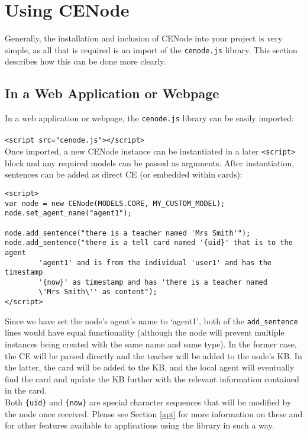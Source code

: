 \documentclass{scrartcl}
\newcommand{\js}[1]{\texttt{#1}}
\begin{document}
\section{Using CENode}
Generally, the installation and inclusion of CENode into your project is very simple, as all that is required is an import of the \js{cenode.js} library. This section describes how this can be done more clearly.

\subsection{In a Web Application or Webpage}
\label{as_a_webapp}
In a web application or webpage, the \js{cenode.js} library can be easily imported:\\
\\\js{<script src="cenode.js"></script>}\\

Once imported, a new CENode instance can be instantiated in a later \js{<script>} block and any required models can be passed as arguments. After instantiation, sentences can be added as direct CE (or embedded within cards):
\begin{verbatim}
<script>
var node = new CENode(MODELS.CORE, MY_CUSTOM_MODEL);
node.set_agent_name("agent1");

node.add_sentence("there is a teacher named 'Mrs Smith'");
node.add_sentence("there is a tell card named '{uid}' that is to the agent 
        'agent1' and is from the individual 'user1' and has the timestamp 
        '{now}' as timestamp and has 'there is a teacher named 
        \'Mrs Smith\'' as content");
</script>
\end{verbatim}

Since we have set the node's agent's name to `agent1', both of the \js{add\_sentence} lines would have equal functionality (although the node will prevent multiple instances being created with the same name and same type). In the former case, the CE will be parsed directly and the teacher will be added to the node's KB. In the latter, the card will be added to the KB, and the local agent will eventually find the card and update the KB further with the relevant information contained in the card.\\

Both \js{\{uid\}} and \js{\{now\}} are special character sequences that will be modified by the node once received. Please see Section \ref{api} for more information on these and for other features available to applications using the library in such a way.
\end{document}
